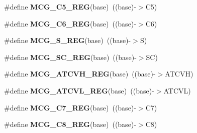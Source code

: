 \begin{DoxyCompactItemize}
\item 
\#define {\bfseries M\+C\+G\+\_\+\+C5\+\_\+\+R\+EG}(base)~((base)-\/$>$C5)\hypertarget{group__MCG__Register__Accessor__Macros_ga8d61340716746b32bbf9dc08f45bd8f6}{}\label{group__MCG__Register__Accessor__Macros_ga8d61340716746b32bbf9dc08f45bd8f6}

\item 
\#define {\bfseries M\+C\+G\+\_\+\+C6\+\_\+\+R\+EG}(base)~((base)-\/$>$C6)\hypertarget{group__MCG__Register__Accessor__Macros_ga900a3edcbbfc2933afe2a26c6774fd69}{}\label{group__MCG__Register__Accessor__Macros_ga900a3edcbbfc2933afe2a26c6774fd69}

\item 
\#define {\bfseries M\+C\+G\+\_\+\+S\+\_\+\+R\+EG}(base)~((base)-\/$>$S)\hypertarget{group__MCG__Register__Accessor__Macros_gac8e21014738ce19fa716fe2ee80f1a64}{}\label{group__MCG__Register__Accessor__Macros_gac8e21014738ce19fa716fe2ee80f1a64}

\item 
\#define {\bfseries M\+C\+G\+\_\+\+S\+C\+\_\+\+R\+EG}(base)~((base)-\/$>$SC)\hypertarget{group__MCG__Register__Accessor__Macros_gaccd64981395ccd3872a484806162a8ac}{}\label{group__MCG__Register__Accessor__Macros_gaccd64981395ccd3872a484806162a8ac}

\item 
\#define {\bfseries M\+C\+G\+\_\+\+A\+T\+C\+V\+H\+\_\+\+R\+EG}(base)~((base)-\/$>$A\+T\+C\+VH)\hypertarget{group__MCG__Register__Accessor__Macros_gaca17ff8b94752a7700acc7adc7e462ea}{}\label{group__MCG__Register__Accessor__Macros_gaca17ff8b94752a7700acc7adc7e462ea}

\item 
\#define {\bfseries M\+C\+G\+\_\+\+A\+T\+C\+V\+L\+\_\+\+R\+EG}(base)~((base)-\/$>$A\+T\+C\+VL)\hypertarget{group__MCG__Register__Accessor__Macros_gae8da97d512d94aa7026889ca0aadedbf}{}\label{group__MCG__Register__Accessor__Macros_gae8da97d512d94aa7026889ca0aadedbf}

\item 
\#define {\bfseries M\+C\+G\+\_\+\+C7\+\_\+\+R\+EG}(base)~((base)-\/$>$C7)\hypertarget{group__MCG__Register__Accessor__Macros_ga539e138338d19786d39052d096896e96}{}\label{group__MCG__Register__Accessor__Macros_ga539e138338d19786d39052d096896e96}

\item 
\#define {\bfseries M\+C\+G\+\_\+\+C8\+\_\+\+R\+EG}(base)~((base)-\/$>$C8)\hypertarget{group__MCG__Register__Accessor__Macros_ga9d7e2b88a408a722f0b7f64a7a32af01}{}\label{group__MCG__Register__Accessor__Macros_ga9d7e2b88a408a722f0b7f64a7a32af01}


\end{DoxyCompactItemize}
